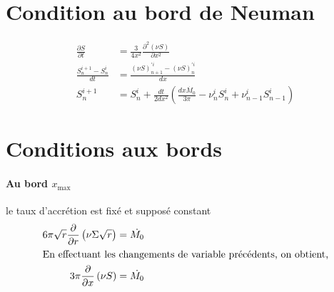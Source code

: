 \documentclass[a4paper,11pt]{article}
\begin{document}
\section{Condition au bord de Neuman}

\begin{align}
\frac{\partial S}{\partial t} &= \frac{3}{4x^2}\frac{\partial^2 (\nu S)}{\partial x^2} \\
\frac{S^{i+1}_n-S^i_n}{dt} &= \frac{(\nu S)_{n+1}^{\prime i}-(\nu S)_{n}^{\prime i}}{dx} \\
S^{i+1}_n &= S^i_n + \frac{dt}{2 dx^2} \left( \frac{dx\dot{M_0}}{3\pi} - \nu^i_n S^i_n + \nu^i_{n-1} S^i_{n-1}\right)
\end{align}

\section{Conditions aux bords}

\paragraph {Au bord $x_\text{max}$}
le taux d'accrétion est fixé et supposé constant
\begin{align}
  6\pi\sqrt{r}\frac{\partial}{\partial r}\left(\nu\Sigma\sqrt{r}\right) &= \dot{M_0}\\
  \intertext{En effectuant les changements de variable précédents, on obtient,}
  3\pi\frac{\partial}{\partial x}\left(\nu S\right) &= \dot{M_0}\\
\end{align}
\end{document}

